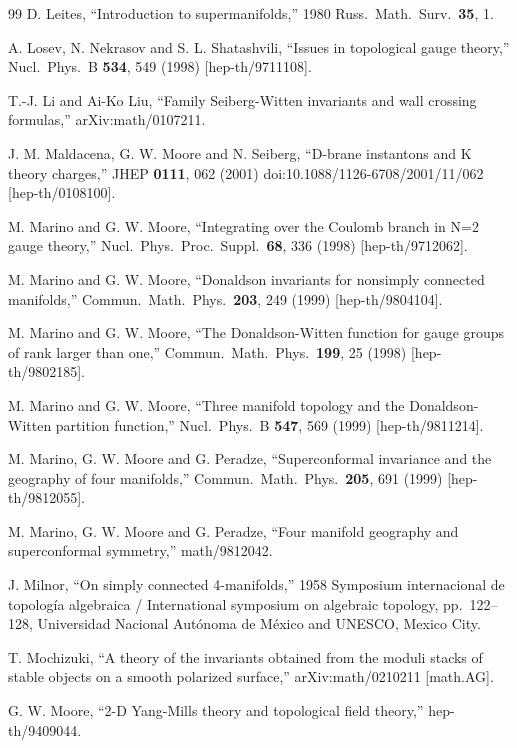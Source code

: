 \begin{thebibliography}{99}
 D. Leites, ``Introduction to supermanifolds,'' 1980 Russ.\ Math.\ Surv.\
\textbf{35}, 1.

 A. Losev, N. Nekrasov and S. L. Shatashvili, ``Issues in topological gauge
theory,'' Nucl.\ Phys.\ B \textbf{534}, 549 (1998) [hep-th/9711108].

 T.-J. Li and Ai-Ko Liu, ``Family Seiberg-Witten invariants and wall
crossing formulas,'' arXiv:math/0107211.

 J. M. Maldacena, G. W. Moore and N. Seiberg, ``D-brane instantons and
K theory charges,'' JHEP \textbf{0111}, 062 (2001) doi:10.1088/1126-6708/2001/11/062
[hep-th/0108100].

 M. Marino and G. W. Moore, ``Integrating over the Coulomb branch in N=2
gauge theory,'' Nucl.\ Phys.\ Proc.\ Suppl.\ \textbf{68}, 336 (1998) [hep-th/9712062].

 M. Marino and G. W. Moore, ``Donaldson invariants for nonsimply connected
manifolds,'' Commun.\ Math.\ Phys.\ \textbf{203}, 249 (1999) [hep-th/9804104].

 M. Marino and G. W. Moore, ``The Donaldson-Witten function for gauge groups
of rank larger than one,'' Commun.\ Math.\ Phys.\ \textbf{199}, 25 (1998)
[hep-th/9802185].

 M. Marino and G. W. Moore, ``Three manifold topology and the
Donaldson-Witten partition function,'' Nucl.\ Phys.\ B \textbf{547}, 569 (1999)
[hep-th/9811214].

 M. Marino, G. W. Moore and G. Peradze, ``Superconformal invariance and the
geography of four manifolds,'' Commun.\ Math.\ Phys.\ \textbf{205}, 691 (1999)
[hep-th/9812055].

 M. Marino, G. W. Moore and G. Peradze, ``Four manifold geography and
superconformal symmetry,'' math/9812042.

 J. Milnor, ``On simply connected 4-manifolds,'' 1958 Symposium
internacional de topolog\'ia algebraica / International symposium on algebraic topology,
pp.~122--128, Universidad Nacional Aut\'onoma de M\'exico and UNESCO, Mexico City.

 T. Mochizuki, ``A theory of the invariants obtained from the moduli stacks
of stable objects on a smooth polarized surface,'' arXiv:math/0210211 [math.AG].

 G. W. Moore, ``2-D Yang-Mills theory and topological field theory,''
hep-th/9409044.


\end{thebibliography}
